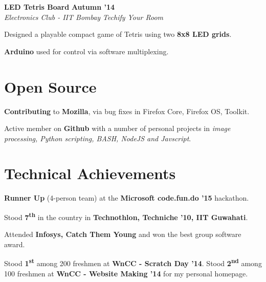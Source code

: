 \documentclass[11pt]{resume}
\begin{document}
\begin{resume}
\textbf{LED Tetris Board} \hfill \textbf{Autumn '14}\\
\textsl{Electronics Club - IIT Bombay} \hfill \textsl{Techify Your Room}\\
\vspace{-4mm}
\begin{list2}
\item Designed a playable compact game of Tetris using two \textbf{8x8 LED grids}.
\item \textbf{Arduino} used for control via software multiplexing.
\end{list2}


\section{\mysidestyle Open Source}

\begin{list2}
\item \textbf{Contributing} to \textbf{Mozilla}, via bug fixes in Firefox Core, Firefox OS, Toolkit.
\item Active member on \textbf{Github} with a number of personal projects in \textsl{image processing, Python scripting, BASH, NodeJS and Javscript}.

\end{list2}



\section{\mysidestyle Technical Achievements} 
\begin{list2}
\item\textbf{Runner Up} (4-person team) at the \textbf{Microsoft code.fun.do '15} hackathon.

\item Stood \textbf {7\textsuperscript{th}} in the country in \textbf {Technothlon, Techniche '10, IIT Guwahati}.

\item Attended \textbf{Infosys, Catch Them Young} and won the best group software award. 

\item Stood \textbf {1\textsuperscript{st}} among 200 freshmen at \textbf {WnCC - Scratch Day '14}. Stood \textbf {2\textsuperscript{nd}} among 100 freshmen at \textbf {WnCC - Website Making '14} for my personal homepage.




\end{list2}
\end{resume}
\end{document}
